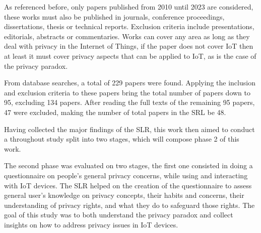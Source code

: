 


As referenced before, only papers published from 2010 until 2023 are considered,
these works must also be published in journals, conference proceedings, dissertations,
thesis or technical reports. Exclusion criteria include presentations, editorials,
abstracts or commentaries. Works can cover any area as long as they deal with
privacy in the Internet of Things, if the paper does not cover IoT then at least
it must cover privacy aspects that can be applied to IoT, as is the case of the
privacy paradox.

From database searches, a total of 229 papers were found. Applying the inclusion
and exclusion criteria to these papers bring the total number of papers down to
95, excluding 134 papers. After reading the full texts of the remaining 95 papers,
47 were excluded, making the number of total papers in the SRL be 48.

Having collected the major findings of the SLR, this work then aimed to conduct a
throughout study split into two stages, which will compose phase 2 of this work.




The second phase was evaluated on two stages, the first one consisted
in doing a questionnaire on people's general privacy concerns, while using and interacting
with IoT devices. The SLR helped on the creation of the questionnaire to
assess general user's knowledge on privacy concepts, their habits and concerns,
their understanding of privacy rights, and what they do to safeguard those
rights. The goal of this study was to both understand the privacy paradox
and collect insights on how to address privacy issues in IoT devices.

